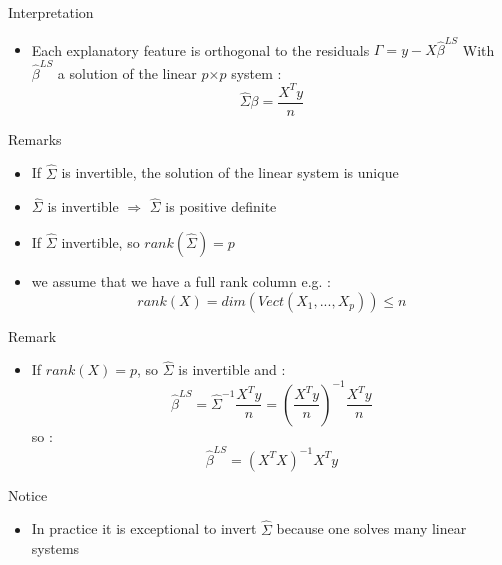 \documentclass[unknownkeysallowed]{beamer}
\begin{document}
\begin{frame}

\begin{alertblock}{Interpretation}
    \begin{itemize}
        \item  Each explanatory feature is orthogonal to the residuals $\Gamma=y-X\hat{\beta}^{LS}$ With $\hat{\beta}^{LS}$ a solution of the linear $p$$\times$$p$ system : $$ \hat{\Sigma}\beta= \frac{X^T y}{n}  $$
       
    \end{itemize}


\end{alertblock}

\begin{block}{Remarks}
    \begin{itemize}
        \item  If $\hat{\Sigma}$ is invertible, the solution of the linear system is unique
        \item $\hat{\Sigma}$ is invertible $\Rightarrow$ $\hat{\Sigma}$ is positive definite
        \item If $\hat{\Sigma}$ invertible, so $rank(\hat{\Sigma})=p$
        \item we assume that we have a full rank column e.g. : $$rank(X)=dim(Vect(X_1,...,X_p)) \leq n $$
       
    \end{itemize}


\end{block}
\end{frame}



\begin{frame}



\begin{alertblock}{Remark}
    \begin{itemize}
        \item  If $rank(X)=p$, so $\hat{\Sigma}$ is invertible and : $$\hat{\beta}^{LS}=\hat{\Sigma}^{-1}\frac{X^T y}{n}=(\frac{X^T y}{n})^{-1} \frac{X^T y}{n}$$
       so :  $$ \hat{\beta}^{LS}=(X^TX)^{-1}X^Ty$$
       
    \end{itemize}


\end{alertblock}

\begin{block}{Notice}
    \begin{itemize}
        \item  In practice it is exceptional to invert $\hat{\Sigma} $ because one solves many linear systems
       
    \end{itemize}


\end{block}
\end{frame}
\end{document}
